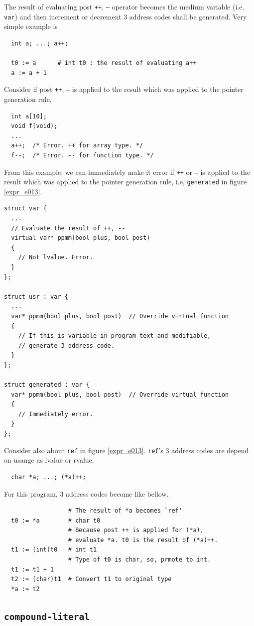 The result of evaluating post {\tt{++}}, {\tt{--}} operator 
becomes the medium variable (i.e. {\tt{var}}) and then
increment or decrement 3 address codes shall be generated.
Very simple example is
\begin{verbatim}
  int a; ...; a++;

  t0 := a      # int t0 : the result of evaluating a++ 
  a := a + 1
\end{verbatim}

Consider if post {\tt{++}},  {\tt{--}} is applied to the result which was
applied to the pointer generation rule.
\begin{verbatim}
  int a[10];
  void f(void);
  ...
  a++;  /* Error. ++ for array type. */
  f--;  /* Error. -- for function type. */
\end{verbatim}
From this example, we can immediately make it error
if {\tt{++}} or {\tt{--}} is applied to the result which was
applied to the pointer generation rule, i.e, {\tt{generated}} 
in figure \ref{expr_e013}.
\begin{verbatim}
struct var {
  ...
  // Evaluate the result of ++, --
  virtual var* ppmm(bool plus, bool post)
  {
    // Not lvalue. Error.
  }
};

struct usr : var {
  ...
  var* ppmm(bool plus, bool post)  // Override virtual function
  {
    // If this is variable in program text and modifiable,
    // generate 3 address code.
  }
};

struct generated : var {
  var* ppmm(bool plus, bool post)  // Override virtual function
  {
    // Immediately error.
  }
};
\end{verbatim}

Consider also about {\tt{ref}} in figure \ref{expr_e013}.
{\tt{ref}}'s 3 address codes are depend on usange as lvalue or rvalue.
\begin{verbatim}
  char *a; ...; (*a)++;
\end{verbatim}
For this program, 3 address codes become like bellow.
\begin{verbatim}
                  # The result of *a becomes `ref'
  t0 := *a        # char t0
                  # Because post ++ is applied for (*a),
                  # evaluate *a. t0 is the result of (*a)++.
  t1 := (int)t0   # int t1
                  # Type of t0 is char, so, prmote to int.
  t1 := t1 + 1
  t2 := (char)t1  # Convert t1 to original type
  *a := t2 
\end{verbatim}

\subsection{{\tt{compound-literal}}}

